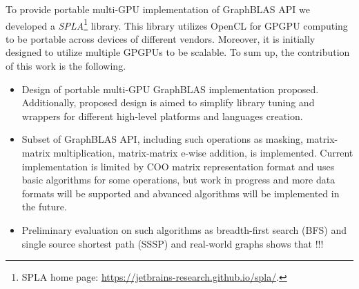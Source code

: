 To provide portable multi-GPU implementation of GraphBLAS API we developed a \textit{SPLA}\footnote{SPLA home page: \url{https://jetbrains-research.github.io/spla/}.} library.
This library utilizes OpenCL for GPGPU computing to be portable across devices of different vendors.
Moreover, it is initially designed to utilize multiple GPGPUs to be scalable.
To sum up, the contribution of this work is the following.
\begin{itemize}
    \item Design of portable multi-GPU GraphBLAS implementation proposed. Additionally, proposed design is aimed to simplify library tuning and wrappers for different high-level platforms and languages creation. 
    \item Subset of GraphBLAS API, including such operations as masking, matrix-matrix multiplication, matrix-matrix e-wise addition, is implemented. Current implementation is limited by COO matrix representation format and uses basic algorithms for some operations, but work in progress and more data formats will be supported and abvanced algorithms will be implemented in the future.
    \item Preliminary evaluation on such algorithms as breadth-first search (BFS) and single source shortest path (SSSP) and real-world graphs shows that !!!
\end{itemize} 